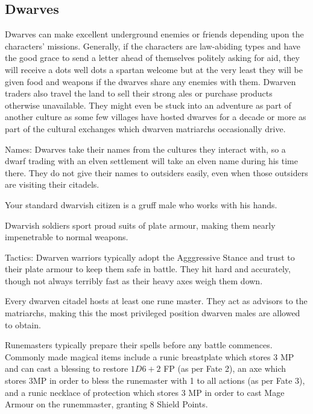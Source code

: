 \subsection{Dwarves}

Dwarves can make excellent underground enemies or friends depending upon the characters' missions.  Generally, if the characters are law-abiding types and have the good grace to send a letter ahead of themselves politely asking for aid, they will receive a dots well dots a spartan welcome but at the very least they will be given food and weapons if the dwarves share any enemies with them.  Dwarven traders also travel the land to sell their strong ales or purchase products otherwise unavailable.  They might even be stuck into an adventure as part of another culture as some few villages have hosted dwarves for a decade or more as part of the cultural exchanges which dwarven matriarchs occasionally drive.

	Names: Dwarves take their names from the cultures they interact with, so a dwarf trading with an elven settlement will take an elven name during his time there.  They do not give their names to outsiders easily, even when those outsiders are visiting their citadels.

\label{dwarven_trader}
\dwarventrader

Your standard dwarvish citizen is a gruff male who works with his hands.

\label{dwarven_soldier}
\dwarvensoldier

Dwarvish soldiers sport proud suits of plate armour, making them nearly impenetrable to normal weapons.

	Tactics: Dwarven  warriors typically adopt the Agggressive Stance and trust to their plate armour to keep them safe in battle.  They hit hard and accurately, though not always terribly fast as their heavy axes weigh them down.

\label{dwarven_runemaster}
\dwarvenrunemaster

Every dwarven citadel hosts at least one rune master.  They act as advisors to the matriarchs, making this the most privileged position dwarven males are allowed to obtain.

	Runemasters typically prepare their spells before any battle commences. Commonly made magical items include a runic breastplate which stores 3 MP and can cast  a blessing to restore $1D6+2$ FP (as per Fate 2), an axe which stores 3MP in order to bless the runemaster with 1 to all actions (as per Fate 3), and a runic necklace of protection which stores 3 MP in order to cast Mage Armour on the runemmaster, granting 8 Shield Points.

